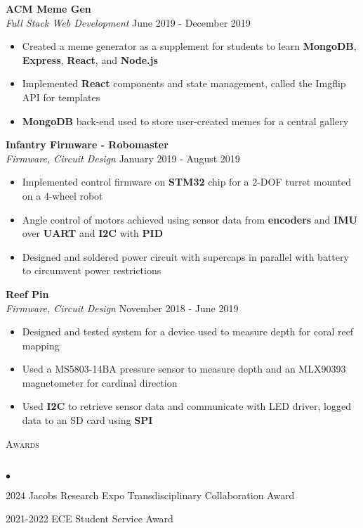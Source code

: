 \documentclass[a4paper]{article}
\newcommand{\lineunder} {
    \vspace*{-8pt} \\
    \hspace*{-18pt} \hrulefill \\
}
\newcommand{\header} [1] {
    {\hspace*{-18pt}\vspace*{6pt} \textsc{#1}}
    \vspace*{-6pt} \lineunder
}
\newenvironment{achievements}{
    \begin{list}
        {$\bullet$}{\topsep 0pt \itemsep -2pt}}{\vspace*{4pt}
    \end{list}
}
\newenvironment{entry}[4][]{
  \textbf{#2} \hfill #1 \\
  \textit{#3} \hfill #4 \\
  \vspace{-2mm}
  \begin{itemize} \itemsep 0em
  }
  {
  \end{itemize}
}
\begin{document}
\begin{entry}{ACM Meme Gen}{Full Stack Web Development}{June 2019 - December 2019}
\item Created a meme generator as a supplement for students to learn \textbf{MongoDB}, \textbf{Express}, \textbf{React}, and \textbf{Node.js}
\item Implemented \textbf{React} components and state management, called the
  Imgflip API for templates
\item \textbf{MongoDB} back-end used to store user-created memes for a central gallery
\end{entry}

\begin{entry}{Infantry Firmware - Robomaster}{Firmware, Circuit Design}{January 2019 - August 2019}
\item Implemented control firmware on \textbf{STM32} chip for a 2-DOF turret mounted on a 4-wheel robot
\item Angle control of motors achieved using sensor data from \textbf{encoders} and \textbf{IMU}
  over \textbf{UART} and \textbf{I2C} with \textbf{PID}
\item Designed and soldered power circuit with supercaps in parallel with
  battery to circumvent power restrictions
\end{entry}

\begin{entry}{Reef Pin}{Firmware, Circuit Design}{November 2018 - June 2019}
\item Designed and tested system for a device used to measure depth for coral reef mapping
\item Used a MS5803-14BA pressure sensor to measure depth and an MLX90393 magnetometer for cardinal direction
\item Used \textbf{I2C} to retrieve sensor data and communicate with LED driver, logged data to an SD card using \textbf{SPI}
\end{entry}


\header{Awards}
\begin{achievements}
\item 2024 Jacobs Research Expo Transdisciplinary Collaboration Award
\item 2021-2022 ECE Student Service Award
\end{achievements}

\begin{comment}
\header{Favorite Video Games}
Street Fighter 6, Tears of the Kingdom, Hollow Knight, Celeste
\end{comment}
\ 
\end{document}
